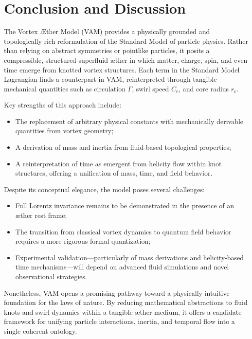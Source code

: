 \section{Conclusion and Discussion}

The Vortex Æther Model (VAM) provides a physically grounded and topologically rich reformulation of the Standard Model of particle physics. Rather than relying on abstract symmetries or pointlike particles, it posits a compressible, structured superfluid æther in which matter, charge, spin, and even time emerge from knotted vortex structures. Each term in the Standard Model Lagrangian finds a counterpart in VAM, reinterpreted through tangible mechanical quantities such as circulation $\Gamma$, swirl speed $C_e$, and core radius $r_c$.

Key strengths of this approach include:
\begin{itemize}
    \item The replacement of arbitrary physical constants with mechanically derivable quantities from vortex geometry;
    \item A derivation of mass and inertia from fluid-based topological properties;
    \item A reinterpretation of time as emergent from helicity flow within knot structures, offering a unification of mass, time, and field behavior.
\end{itemize}

Despite its conceptual elegance, the model poses several challenges:
\begin{itemize}
    \item Full Lorentz invariance remains to be demonstrated in the presence of an æther rest frame;
    \item The transition from classical vortex dynamics to quantum field behavior requires a more rigorous formal quantization;
    \item Experimental validation—particularly of mass derivations and helicity-based time mechanisms—will depend on advanced fluid simulations and novel observational strategies.
\end{itemize}

Nonetheless, VAM opens a promising pathway toward a physically intuitive foundation for the laws of nature. By reducing mathematical abstractions to fluid knots and swirl dynamics within a tangible æther medium, it offers a candidate framework for unifying particle interactions, inertia, and temporal flow into a single coherent ontology.

